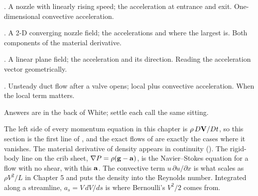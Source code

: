 \begin{ladder}
\item {}. A nozzle with linearly rising speed; the acceleration at entrance and exit. One-dimensional convective acceleration.
\item {}. A 2-D converging nozzle field; the accelerations and where the largest is. Both components of the material derivative.
\item {}. A linear plane field; the acceleration and its direction. Reading the acceleration vector geometrically.
\item {}. Unsteady duct flow after a valve opens; local plus convective acceleration. When the local term matters.
\end{ladder}
Answers are in the back of White; settle each call the same sitting.


\begin{hides}
The left side of every momentum equation in this chapter is $\rho\,D\mathbf{V}/Dt$, so this section is the first line of , and the exact flows of  are exactly the cases where it vanishes. The material derivative of density appears in continuity (). The rigid-body line on the crib sheet, $\nabla P = \rho(\mathbf{g} - \mathbf{a})$, is the Navier--Stokes equation for a flow with no shear, with this $\mathbf{a}$. The convective term $u\,\partial u/\partial x$ is what scales as $\rho V^2/L$ in Chapter 5 and puts the density into the Reynolds number. Integrated along a streamline, $a_s = V\,dV/ds$ is where Bernoulli's $V^2/2$ comes from.
\end{hides}
